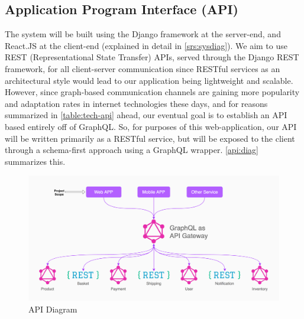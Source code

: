\subsection{Application Program Interface (API)}
The system will be built using the Django framework at the server-end, and React.JS at the client-end (explained in detail in \autoref{srs:sysdiag}). We aim to use REST (Representational State Transfer) APIs, served through the Django REST framework, for all client-server communication since RESTful services as an architectural style would lead to our application being lightweight and scalable. However, since graph-based communication channels are gaining more popularity and adaptation rates in internet technologies these days, and for reasons summarized in \autoref{table:tech-api} ahead, our eventual goal is to establish an API based entirely off of GraphQL. So, for purposes of this web-application, our API will be written primarily as a RESTful service, but will be exposed to the client through a schema-first approach using a GraphQL wrapper. \autoref{api:diag} summarizes this.
\begin{figure}[H]
\includegraphics[width=15cm]{images/APIDiagram.pdf} 
\centering
\caption{API Diagram}
\label{api:diag}
\end{figure}

